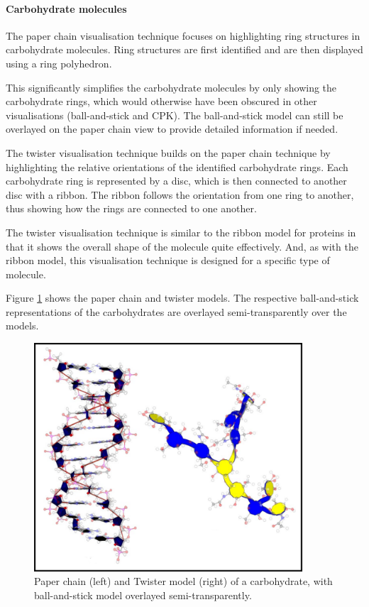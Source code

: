 
\paragraph{Carbohydrate molecules}

The paper chain visualisation technique \citep{kuttel06} focuses on
highlighting ring structures in carbohydrate molecules. Ring structures are
first identified and are then displayed using a ring polyhedron.

This significantly simplifies the carbohydrate molecules by only showing the
carbohydrate rings, which would otherwise have been obscured in other
visualisations (ball-and-stick and CPK). The ball-and-stick model can still be
overlayed on the paper chain view to provide detailed information if needed.

The twister visualisation technique \citep{kuttel06} builds on the paper chain
technique by highlighting the relative orientations of the identified
carbohydrate rings. Each carbohydrate ring is represented by a disc, which is
then connected to another disc with a ribbon. The ribbon follows the
orientation from one ring to another, thus showing how the rings are connected
to one another.

The twister visualisation technique is similar to the ribbon model for proteins
in that it shows the overall shape of the molecule quite effectively. And, as
with the ribbon model, this visualisation technique is designed for a specific
type of molecule.

Figure \ref{fig:background_chain_twister} shows the paper chain and twister
models. The respective ball-and-stick representations of the carbohydrates are
overlayed semi-transparently over the models.

\begin{figure}
  \begin{center}
    \includegraphics[width=100mm]{chain_twister}
  \end{center}
  \caption{Paper chain (left) and Twister model (right) of a carbohydrate, with
  ball-and-stick model overlayed semi-transparently.}
  \label{fig:background_chain_twister}
\end{figure}

